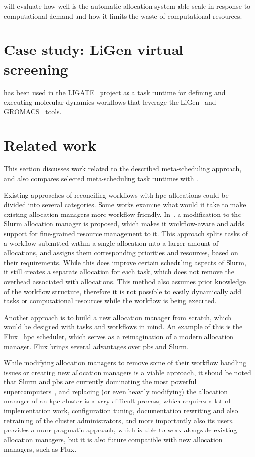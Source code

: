  will evaluate how well is the automatic allocation system able
scale in response to computational demand and how it limits the waste of computational resources.

\section{Case study: LiGen virtual screening}
\hyperqueue{} has been used in the LIGATE~\cite{ligate} project as a task runtime for defining and executing molecular
dynamics workflows that leverage the LiGen~\cite{TODO} and GROMACS~\cite{TODO} tools.

\section{Related work}
\label{hq:related-work}
This section discusses work related to the described meta-scheduling approach, and also compares
selected meta-scheduling task runtimes with \hyperqueue{}.

Existing approaches of reconciling workflows with \gls{hpc} allocations could be
divided into several categories. Some works examine what would it take to make existing allocation
managers more workflow friendly. In~\cite{slurm-workflow}, a modification to the Slurm allocation
manager is proposed, which makes it workflow-aware and adds support for fine-grained resource
management to it. This approach splits tasks of a workflow submitted within a single allocation
into a larger amount of allocations, and assigns them corresponding priorities and resources, based
on their requirements. While this does improve certain scheduling aspects of Slurm, it still
creates a separate allocation for each task, which does not remove the overhead associated with
allocations. This method also assumes prior knowledge of the workflow structure, therefore it is
not possible to easily dynamically add tasks or computational resources while the workflow is being
executed.

Another approach is to build a new allocation manager from scratch, which would be designed with
tasks and workflows in mind. An example of this is the Flux~\cite{flux}
\gls{hpc} scheduler, which serves as a reimagination of a modern allocation manager.
Flux brings several advantages over \gls{pbs} and Slurm.

While modifying allocation managers to remove some of their workflow handling issues or creating
new allocation managers is a viable approach, it shoud be noted that Slurm and
\gls{pbs} are currently dominating the most powerful
supercomputers~\cite{slurm-schedmd}, and replacing (or even heavily modifying) the allocation
manager of an \gls{hpc} cluster is a very difficult process, which requires a lot of
implementation work, configuration tuning, documentation rewriting and also retraining of the
cluster administrators, and more importantly also its users. \hyperqueue{} provides a
more pragmatic approach, which is able to work alongside existing allocation managers, but it is
also future compatible with new allocation managers, such as Flux.

